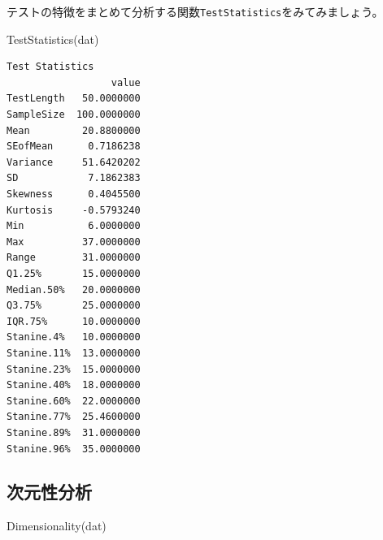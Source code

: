 \documentclass[
  a4paper,
]{ltjsbook}
\newenvironment{Shaded}{\begin{snugshade}}{\end{snugshade}}
\newcommand{\FunctionTok}[1]{\textcolor[rgb]{0.28,0.35,0.67}{#1}}
\newcommand{\NormalTok}[1]{\textcolor[rgb]{0.00,0.23,0.31}{#1}}
\begin{document}
テストの特徴をまとめて分析する関数\texttt{TestStatistics}をみてみましょう。

\begin{Shaded}
\begin{Highlighting}[]
\FunctionTok{TestStatistics}\NormalTok{(dat)}
\end{Highlighting}
\end{Shaded}

\begin{verbatim}
Test Statistics
                  value
TestLength   50.0000000
SampleSize  100.0000000
Mean         20.8800000
SEofMean      0.7186238
Variance     51.6420202
SD            7.1862383
Skewness      0.4045500
Kurtosis     -0.5793240
Min           6.0000000
Max          37.0000000
Range        31.0000000
Q1.25%       15.0000000
Median.50%   20.0000000
Q3.75%       25.0000000
IQR.75%      10.0000000
Stanine.4%   10.0000000
Stanine.11%  13.0000000
Stanine.23%  15.0000000
Stanine.40%  18.0000000
Stanine.60%  22.0000000
Stanine.77%  25.4600000
Stanine.89%  31.0000000
Stanine.96%  35.0000000
\end{verbatim}

\subsection{次元性分析}\label{ux6b21ux5143ux6027ux5206ux6790}

\begin{Shaded}
\begin{Highlighting}[]
\FunctionTok{Dimensionality}\NormalTok{(dat)}
\end{Highlighting}
\end{Shaded}
\end{document}
